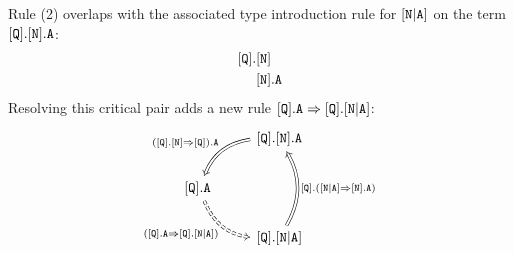 \documentclass[../generics]{subfiles}
\begin{document}
Rule (2) overlaps with the associated type introduction rule for $[\texttt{N}|\texttt{A}]$ on the term $[\texttt{Q}].[\texttt{N}].\texttt{A}$:
\begin{align*}
[\texttt{Q}].&[\texttt{N}]\\
&[\texttt{N}].\texttt{A}
\end{align*}
Resolving this critical pair adds a new rule $[\texttt{Q}].\texttt{A}\Rightarrow[\texttt{Q}].[\texttt{N}|\texttt{A}]$:
\[
\begin{tikzcd}
&\protosym{Q}.\protosym{N}.\texttt{A}\arrow[ld, Rightarrow, bend right, "(\protosym{Q}.\protosym{N}\Rightarrow\protosym{Q}).\texttt{A}"']\\
\protosym{Q}.\texttt{A}\arrow[rd, Rightarrow, bend right, dashed, "(\protosym{Q}.\texttt{A}\Rightarrow\protosym{Q}.\assocsym{N}{A})"']&\\
&\protosym{Q}.\assocsym{N}{A}\arrow[uu, Rightarrow, bend right, "\protosym{Q}.(\assocsym{N}{A}\Rightarrow\protosym{N}.\texttt{A})"']
\end{tikzcd}
\]
\end{document}
